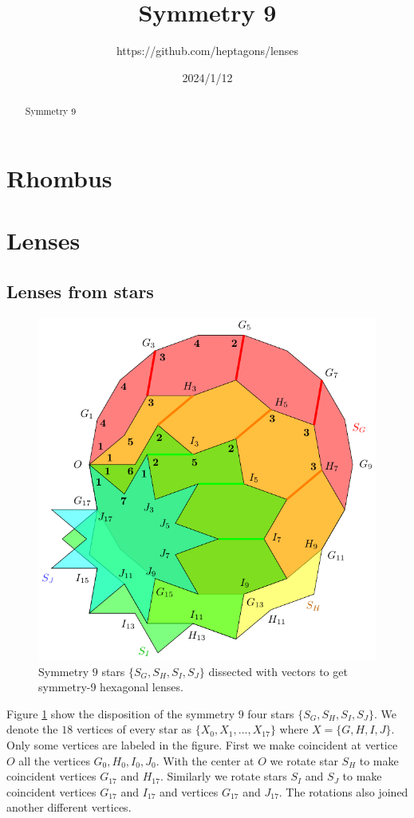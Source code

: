 \documentclass[11pt]{article}
\title{Symmetry 9}
\author{https://github.com/heptagons/lenses}
\date{2024/1/12}
\begin{document}
\maketitle
\begin{abstract}
Symmetry 9
\end{abstract}

\section{Rhombus}

\section{Lenses}

\subsection{Lenses from stars}

\begin{figure}[h]
\centering
\includegraphics[scale=1]{stars-9}
\caption{Symmetry $9$ stars $\{S_G,S_H,S_I,S_J\}$ dissected with vectors to get symmetry-9 hexagonal lenses.}
\label{fig:stars-9}
\end{figure}

Figure \ref{fig:stars-9} show the disposition of the symmetry $9$ four stars $\{S_G,S_H,S_I,S_J\}$. We denote the $18$ vertices of every star as $\{X_0,X_1,...,X_{17}\}$ where $X = \{G,H,I,J\}$. Only some vertices are labeled in the figure. First we make coincident at vertice $O$ all the vertices $G_0,H_0,I_0,J_0$. With the center at $O$ we rotate star $S_H$ to make coincident vertices $G_{17}$ and $H_{17}$. Similarly we rotate stars $S_I$ and $S_J$ to make coincident vertices $G_{17}$ and $I_{17}$ and vertices $G_{17}$ and $J_{17}$. The rotations also joined another different vertices.
\end{document}
